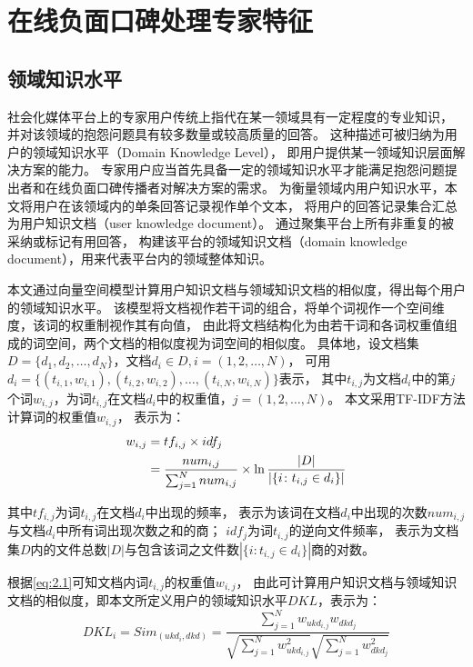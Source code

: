 \section{在线负面口碑处理专家特征}\label{sec:2.2}
\subsection{领域知识水平}\label{subsection:2.2.1}
社会化媒体平台上的专家用户传统上指代在某一领域具有一定程度的专业知识，
并对该领域的抱怨问题具有较多数量或较高质量的回答。
这种描述可被归纳为用户的领域知识水平（Domain Knowledge Level），
即用户提供某一领域知识层面解决方案的能力。
专家用户应当首先具备一定的领域知识水平才能满足抱怨问题提出者和在线负面口碑传播者对解决方案的需求。
为衡量领域内用户知识水平，本文将用户在该领域内的单条回答记录视作单个文本，
将用户的回答记录集合汇总为用户知识文档（user knowledge document）。
通过聚集平台上所有非重复的被采纳或标记有用回答，
构建该平台的领域知识文档（domain knowledge document），用来代表平台内的领域整体知识。

本文通过向量空间模型计算用户知识文档与领域知识文档的相似度，得出每个用户的领域知识水平。
该模型将文档视作若干词的组合，将单个词视作一个空间维度，该词的权重制视作其有向值，
由此将文档结构化为由若干词和各词权重值组成的词空间，两个文档的相似度视为词空间的相似度。
具体地，设文档集$D=\{d_1,d_2,\ldots,d_N \}$，文档$d_i \in D, i=(1,2,\ldots,N)$，
可用$d_i=\{(t_{i,1},w_{i,1} ),(t_{i,2},w_{i,2} ),\ldots,(t_{i,N},w_{i,N} )\}$表示，
其中$t_{i,j}$为文档$d_i$中的第$j$个词$w_{i,j}$，为词$t_{i,j}$在文档$d_i$中的权重值，$j=(1,2,\ldots,N)$。
本文采用TF-IDF方法计算词的权重值$w_{i,j}$，
表示为：
\begin{align}\label{eq:2.1}
    w_{i,j} &=tf_{i,j} \times idf_j \\ 
    &= \frac{num_{i,j}}{\sum^N_{j=1} num_{i,j}} \times \ln \frac{|D|}{|\{ i\colon t_{i,j} \in d_i \}|} \notag
\end{align}

其中$tf_{i,j}$为词$t_{i,j}$在文档$d_i$中出现的频率，
表示为该词在文档$d_i$中出现的次数$num_{i,j}$与文档$d_i$中所有词出现次数之和的商；
$idf_j$为词$t_{i,j}$的逆向文件频率，
表示为文档集$D$内的文件总数$|D|$与包含该词之文件数$|\{ i\colon t_{i,j} \in d_i \}|$商的对数。

根据\autoref{eq:2.1}可知文档内词$t_{i,j}$的权重值$w_{i,j}$，
由此可计算用户知识文档与领域知识文档的相似度，即本文所定义用户的领域知识水平$DKL$，表示为：
\begin{equation}\label{eq:2.2}
    DKL_i= Sim_{(ukd_i,dkd)}=\frac{\sum^N_{j=1} w_{ { ukd_{i,j} } } w_{dkd_j} }{\sqrt{\sum^N_{j=1} w^2_{ { ukd_{i,j} } } } \sqrt{\sum^N_{j=1} w^2_{ { dkd_j } } }}
\end{equation}

